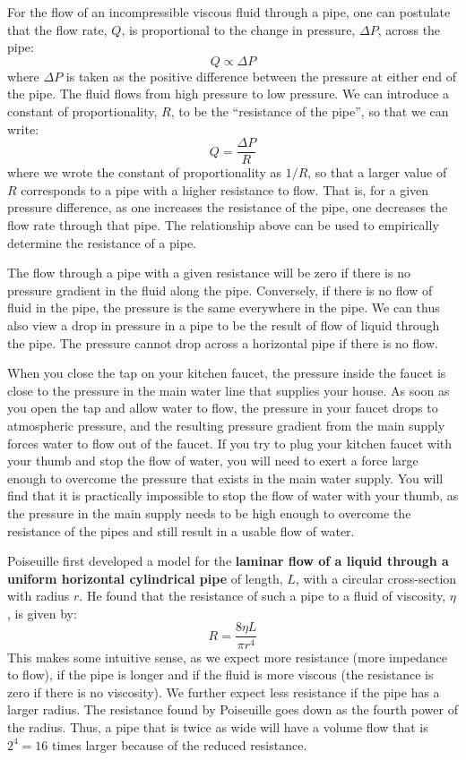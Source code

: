 For the flow of an incompressible viscous fluid through a pipe, one can postulate that the flow rate, $Q$, is proportional to the change in pressure, $\Delta P$, across the pipe:
\begin{equation}
Q \propto \Delta P
\end{equation}
where $\Delta P$ is taken as the positive difference between the pressure at either end of the pipe. The fluid flows from high pressure to low pressure. We can introduce a constant of proportionality, $R$, to be the ``resistance of the pipe'', so that we can write:
\begin{equation}
Q = \frac{\Delta P}{R}
\end{equation}
where we wrote the constant of proportionality as $1/R$, so that a larger value of $R$ corresponds to a pipe with a higher resistance to flow. That is, for a given pressure difference, as one increases the resistance of the pipe, one decreases the flow rate through that pipe. The relationship above can be used to empirically determine the resistance of a pipe.

The flow through a pipe with a given resistance will be zero if there is no pressure gradient in the fluid along the pipe. Conversely, if there is no flow of fluid in the pipe, the pressure is the same everywhere in the pipe. We can thus also view a drop in pressure in a pipe to be the result of flow of liquid through the pipe. The pressure cannot drop across a horizontal pipe if there is no flow.

When you close the tap on your kitchen faucet, the pressure inside the faucet is close to the pressure in the main water line that supplies your house. As soon as you open the tap and allow water to flow, the pressure in your faucet drops to atmospheric pressure, and the resulting pressure gradient from the main supply forces water to flow out of the faucet. If you try to plug your kitchen faucet with your thumb and stop the flow of water, you will need to exert a force large enough to overcome the pressure that exists in the main water supply. You will find that it is practically impossible to stop the flow of water with your thumb, as the pressure in the main supply needs to be high enough to overcome the resistance of the pipes and still result in a usable flow of water.

Poiseuille first developed a model for the \textbf{laminar flow of a liquid through a uniform horizontal cylindrical pipe} of length, $L$, with a circular cross-section with radius $r$. He found that the resistance of such a pipe to a fluid of viscosity, $\eta$, is given by:
\begin{equation}
R = \frac{8\eta L}{\pi r^4}
\end{equation}
This makes some intuitive sense, as we expect more resistance (more impedance to flow), if the pipe is longer and if the fluid is more viscous (the resistance is zero if there is no viscosity). We further expect less resistance if the pipe has a larger radius. The resistance found by Poiseuille goes down as the fourth power of the radius. Thus, a pipe that is twice as wide will have a volume flow that is $2^4=16$ times larger because of the reduced resistance.

